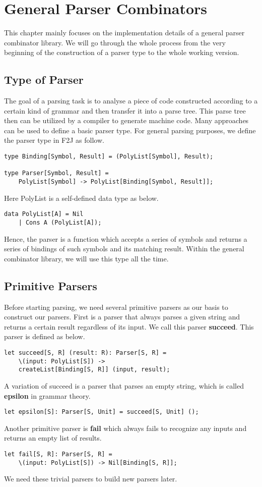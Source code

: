 \chapter{General Parser Combinators}
This chapter mainly focuses on the implementation details of a general parser combinator library. We will go through the whole process from the very beginning of the construction of a parser type to the whole working version.

\section{Type of Parser}
The goal of a parsing task is to analyse a piece of code constructed according to a certain kind of grammar and then transfer it into a parse tree. This parse tree then can be utilized by a compiler to generate machine code. Many approaches can be used to define a basic parser type. For general parsing purposes, we define the parser type in F2J as follow.
\begin{lstlisting}
type Binding[Symbol, Result] = (PolyList[Symbol], Result);

type Parser[Symbol, Result] =
	PolyList[Symbol] -> PolyList[Binding[Symbol, Result]];
\end{lstlisting}
Here PolyList is a self-defined data type as below.
\begin{lstlisting}
data PolyList[A] = Nil
	| Cons A (PolyList[A]);
\end{lstlisting}
Hence, the parser is a function which accepts a series of symbols and returns a series of bindings of such symbols and its matching result. Within the general combinator library, we will use this type all the time.

\section{Primitive Parsers}
Before starting parsing, we need several primitive parsers as our basis to construct our parsers. First is a parser that always parses a given string and returns a certain result regardless of its input. We call this parser \textbf{succeed}. This parser is defined as below.
\begin{lstlisting}
let succeed[S, R] (result: R): Parser[S, R] =
	\(input: PolyList[S]) ->
	createList[Binding[S, R]] (input, result);
\end{lstlisting}
A variation of succeed is a parser that parses an empty string, which is called \textbf{epsilon} in grammar theory.
\begin{lstlisting}
let epsilon[S]: Parser[S, Unit] = succeed[S, Unit] ();
\end{lstlisting}
Another primitive parser is \textbf{fail} which always fails to recognize any inputs and returns an empty list of results.
\begin{lstlisting}
let fail[S, R]: Parser[S, R] =
	\(input: PolyList[S]) -> Nil[Binding[S, R]];
\end{lstlisting}
We need these trivial parsers to build new parsers later.

